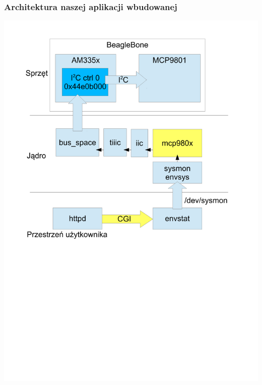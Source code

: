 \documentclass[dvipsnames,table]{beamer}
\begin{document}


\begin{frame}
\frametitle{Architektura naszej aplikacji wbudowanej}
\begin{center}
\includegraphics[scale=0.42]{img_apparch-mcp9801.pdf}
\end{center}
\end{frame}
\end{document}
